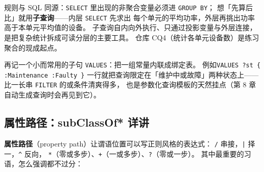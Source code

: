 \begin{codebox}
\codeline{\textcolor{cmtgray}{\#\ 各工作单元的设备数与平均功率，只看设备数\ >=\ 2\ 的单元}}
\codeline{\}}
\end{codebox}

规则与 SQL 同源：\texttt{SELECT} 里出现的非聚合变量必须进 \texttt{GROUP BY}；
想「先算后比」就用\textbf{子查询}——内层 \texttt{SELECT} 先求出
每个单元的平均功率，外层再挑出功率高于本单元平均值的设备。
子查询自内向外执行、只通过投影变量与外层连接，
是把复杂统计拆成可读分层的主要工具。
仓库 CQ4（统计各单元设备数）是练习聚合的现成起点。

再记一个小而常用的子句 \texttt{VALUES}：把一组常量内联成绑定表。
例如\linebreak[4]\texttt{VALUES ?st \{ :Maintenance :Faulty \}}
一行就把查询限定在「维护中或故障」两种状态上——
比一长串 \texttt{FILTER} 的或条件清爽得多，
也是参数化查询模板的天然挂点（第 8 章自动生成查询时会再见到它）。

\subsection{属性路径：subClassOf* 详讲}

\textbf{属性路径}（property path）让谓语位置可以写正则风格的表达式：
\texttt{/} 串接，\texttt{|} 择一，\texttt{\^{}} 反向，
\texttt{*}（零或多步）、\texttt{+}（一或多步）、\texttt{?}（零或一步）。
其中最重要的习语，怎么强调都不过分：

\begin{codebox}
\codeline{\textcolor{cmtgray}{\#\ 标准习语：取某类「连同其全部子类」的实例}}
\codeline{\}}
\codeblank{}
\codeline{\textcolor{cmtgray}{\#\ 传递可达：工序\ Op\_10\ 之后（直接或间接）的全部工序}}
\codeline{\}}
\end{codebox}


